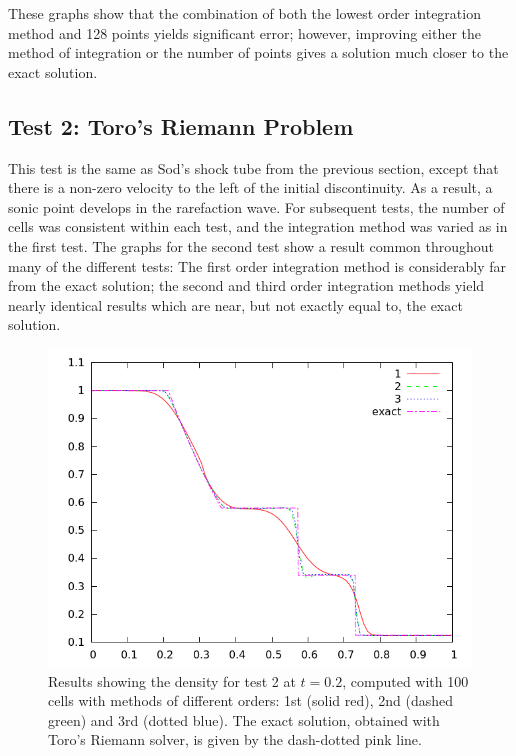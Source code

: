 \documentclass[10pt]{article}
\begin{document}
These graphs show that the combination of both the lowest order integration method and 128 points yields significant error; however, improving either the method of integration or the number of points gives a solution much closer to the exact solution. 

\clearpage

\subsection{Test 2: Toro's Riemann Problem}

This test is the same as Sod's shock tube from the previous section, except that there is a non-zero velocity to the left of the initial discontinuity.  
As a result, a sonic point develops in the rarefaction wave.  
For subsequent tests, the number of cells was consistent within each test, and the integration method was varied as in the first test. 
The graphs for the second test show a result common throughout many of the different tests: The first order integration method is considerably far from the exact solution; the second and third order integration methods yield nearly identical results which are near, but not exactly equal to, the exact solution. 
\begin{figure}[h]
  \begin{center}
     \includegraphics[width=.95\textwidth]{den_T2.png}	
  \end{center}
  \caption{Results showing the density for test 2 at $t=0.2$, computed with 100 cells with methods of different orders: 1st (solid red), 2nd (dashed green) and 3rd (dotted blue). The exact solution, obtained with Toro's Riemann solver, is given by the dash-dotted pink line.}
  \label{fig:den_T2}
\end{figure}
\end{document}
